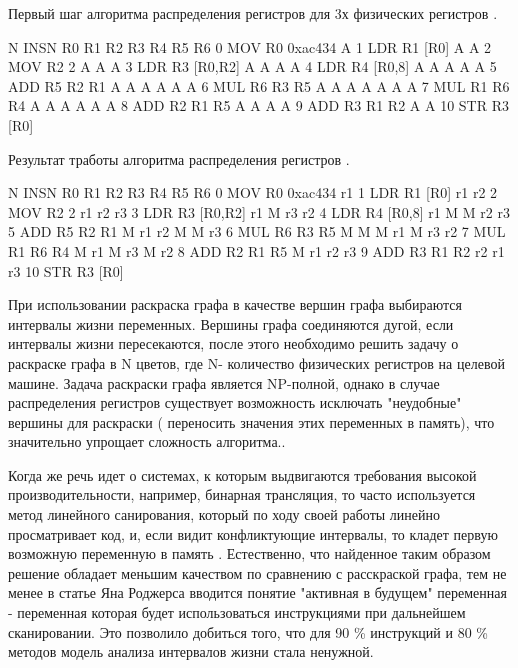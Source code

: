 \begin{ListingEnv}[!h]
\captiondelim{ } 
\caption{Первый шаг алгоритма распределения регистров для 3х физических регистров \cite{melnik2010case}.}\label{partReview:regalloc3}

\begin{Verb}
		N INSN              R0  R1  R2  R3  R4  R5  R6
		0 MOV R0 0xac434    A      
		1 LDR R1 [R0]       A   A
		2 MOV R2 2          A   A   A
		3 LDR R3 [R0,R2]    A   A   A   A
		4 LDR R4 [R0,8]     A   A   A   A   A
		5 ADD R5 R2 R1      A   A   A   A   A   A
		6 MUL R6 R3 R5      A   A   A   A   A   A   A
		7 MUL R1 R6 R4      A   A   A       A   A   A
		8 ADD R2 R1 R5      A   A   A           A
		9 ADD R3 R1 R2      A   A
		10 STR R3 [R0]     
	\end{Verb}
\end{ListingEnv}
\begin{ListingEnv}[!h]
\captiondelim{ } 
\caption{Результат тработы алгоритма распределения регистров \cite{melnik2010case}.}\label{partReview:regalloc4}

\begin{Verb}
		N INSN              R0  R1  R2  R3  R4  R5  R6
		0 MOV R0 0xac434    r1      
		1 LDR R1 [R0]       r1  r2
		2 MOV R2 2          r1  r2  r3
		3 LDR R3 [R0,R2]    r1  M   r3  r2
		4 LDR R4 [R0,8]     r1  M   M   r2  r3
		5 ADD R5 R2 R1      M   r1  r2  M   M   r3
		6 MUL R6 R3 R5      M   M   M   r1  M   r3  r2
		7 MUL R1 R6 R4      M   r1  M       r3  M   r2
		8 ADD R2 R1 R5      M   r1  r2          r3  
		9 ADD R3 R1 R2      r2  r1      r3  
		10 STR R3 [R0]     
	\end{Verb}
\end{ListingEnv}

При использовании раскраска графа в качестве вершин графа выбираются интервалы жизни переменных. Вершины графа соединяются дугой, если интервалы жизни пересекаются, после этого необходимо решить задачу о раскраске графа в N цветов, где N- количество физических регистров на целевой машине. Задача раскраски графа является NP-полной, однако в случае распределения регистров существует возможность исключать "неудобные" вершины для раскраски ( переносить значения этих переменных в память), что значительно упрощает сложность алгоритма.\cite{smith2004generalized, briggs1992register}. 

Когда же речь идет о системах, к которым выдвигаются требования высокой производительности, например, бинарная трансляция, то часто используется метод линейного санирования, который по ходу своей работы линейно просматривает код, и, если видит конфликтующие интервалы, то кладет первую возможную переменную в память \cite{poletto1999linear}. Естественно, что найденное таким образом решение обладает меньшим качеством по сравнению с расскраской графа, тем не менее в статье Яна Роджерса \cite{rogers2020efficient} вводится понятие "активная в будущем" переменная - переменная которая будет использоваться инструкциями при дальнейшем сканировании. Это позволило добиться того, что для 90 \% инструкций и 80 \% методов модель анализа интервалов жизни стала ненужной. 



